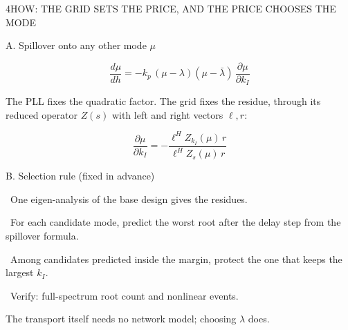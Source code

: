 \begin{minipage}[t][\PosterFourHeight][t]{\PosterGridWidth}\vspace{0pt}
  \begin{PosterPanel}{\PosterFourHeight}{4}{HOW: THE GRID SETS THE PRICE, AND THE PRICE CHOOSES THE MODE}

    \noindent\begin{minipage}[t]{300mm}\vspace{0pt}
      {\Subhead\color{IASDarkGreen}A. Spillover onto any other mode $\mu$\par}\vspace{1mm}
      {\HeroEquation\color{IASBlue}\[
        \frac{d\mu}{dh}=-k_p\,(\mu-\lambda)(\mu-\bar\lambda)\,\frac{\partial\mu}{\partial k_I}
      \]}
      \vspace{-1mm}
      {\FigureSize The PLL fixes the quadratic factor. The grid fixes the residue, through its reduced operator $Z(s)$ with left and right vectors $\ell,r$:\par}
      {\EquationSize\[
        \frac{\partial\mu}{\partial k_I}=-\frac{\ell^{H}Z_{k_I}(\mu)\,r}{\ell^{H}Z_{s}(\mu)\,r}
      \]}
    \end{minipage}\hfill%
    \begin{minipage}[t]{262mm}\vspace{0pt}
      {\Subhead\color{IASDarkGreen}B. Selection rule (fixed in advance)\par}\vspace{1mm}
      {\FigureSize {}\ One eigen-analysis of the base design gives the residues.\par}\vspace{1.5mm}
      {\FigureSize {}\ For each candidate mode, predict the worst root after the delay step from the spillover formula.\par}\vspace{1.5mm}
      {\FigureSize {}\ Among candidates predicted inside the margin, protect the one that keeps the largest $k_I$.\par}\vspace{1.5mm}
      {\FigureSize {}\ Verify: full-spectrum root count and nonlinear events.\par}
      \vspace{2mm}
      {\FigureSize The transport itself needs no network model; choosing $\lambda$ does.\par}
    \end{minipage}\hfill%
    \begin{minipage}[t]{262mm}\vspace{0pt}

\end{minipage}
\end{PosterPanel}
\end{minipage}
